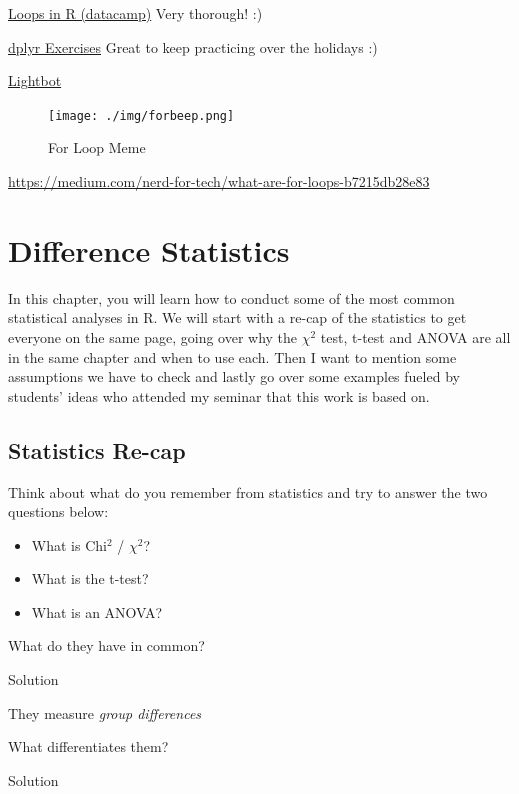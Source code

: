 \documentclass[
]{book}
\providecommand{\tightlist}{%
  \setlength{\itemsep}{0pt}\setlength{\parskip}{0pt}}
\begin{document}
\href{https://www.datacamp.com/tutorial/tutorial-on-loops-in-r}{Loops in R (datacamp)} Very thorough! :)

\href{https://sjspielman.github.io/datascience_for_biologists/exercises/dplyr.html}{dplyr Exercises} Great to keep practicing over the holidays :)

\href{https://lightbot.com/hour-of-code.html}{Lightbot}

\begin{figure}
\centering
\texttt{[image: ./img/forbeep.png]}
\caption{For Loop Meme}
\end{figure}

\url{https://medium.com/nerd-for-tech/what-are-for-loops-b7215db28e83}

\chapter{Difference Statistics}\label{difference-statistics}

In this chapter, you will learn how to conduct some of the most common statistical analyses in R.
We will start with a re-cap of the statistics to get everyone on the same page, going over why the \(\chi^2\) test, t-test and ANOVA are all in the same chapter and when to use each.
Then I want to mention some assumptions we have to check and lastly go over some examples fueled by students' ideas who attended my seminar that this work is based on.

\section{\texorpdfstring{Statistics Re-cap }{Statistics Re-cap }}\label{statistics-re-cap}

Think about what do you remember from statistics and try to answer the two questions below:

\begin{itemize}
\tightlist
\item
  What is Chi\(^2\) / \(\chi^2\)?
\item
  What is the t-test?
\item
  What is an ANOVA?
\end{itemize}

What do they have in common?

Solution

They measure \emph{group differences}

What differentiates them?

Solution
\end{document}
